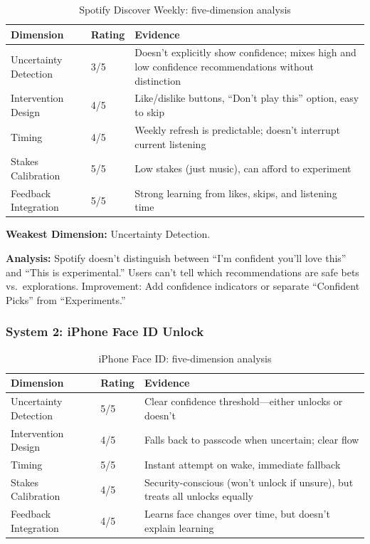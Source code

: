 \begin{table}[htbp]
\caption{Spotify Discover Weekly: five-dimension analysis}
\label{tab:spotify-analysis}
\centering
\begin{tabular}{@{}p{3.5cm}p{1.5cm}p{7cm}@{}}
\toprule
\textbf{Dimension} & \textbf{Rating} & \textbf{Evidence} \\
\midrule
Uncertainty Detection & 3/5 & Doesn't explicitly show confidence; mixes high and low confidence recommendations without distinction \\
Intervention Design & 4/5 & Like/dislike buttons, ``Don't play this'' option, easy to skip \\
Timing & 4/5 & Weekly refresh is predictable; doesn't interrupt current listening \\
Stakes Calibration & 5/5 & Low stakes (just music), can afford to experiment \\
Feedback Integration & 5/5 & Strong learning from likes, skips, and listening time \\
\bottomrule
\end{tabular}
\end{table}

\textbf{Weakest Dimension:} Uncertainty Detection.

\textbf{Analysis:} Spotify doesn't distinguish between ``I'm confident you'll love this'' and ``This is experimental.'' Users can't tell which recommendations are safe bets vs.\ explorations. Improvement: Add confidence indicators or separate ``Confident Picks'' from ``Experiments.''

\subsubsection{System 2: iPhone Face ID Unlock}

\begin{table}[htbp]
\caption{iPhone Face ID: five-dimension analysis}
\label{tab:faceid-analysis}
\centering
\begin{tabular}{@{}p{3.5cm}p{1.5cm}p{7cm}@{}}
\toprule
\textbf{Dimension} & \textbf{Rating} & \textbf{Evidence} \\
\midrule
Uncertainty Detection & 5/5 & Clear confidence threshold---either unlocks or doesn't \\
Intervention Design & 4/5 & Falls back to passcode when uncertain; clear flow \\
Timing & 5/5 & Instant attempt on wake, immediate fallback \\
Stakes Calibration & 4/5 & Security-conscious (won't unlock if unsure), but treats all unlocks equally \\
Feedback Integration & 4/5 & Learns face changes over time, but doesn't explain learning \\
\bottomrule
\end{tabular}
\end{table}


